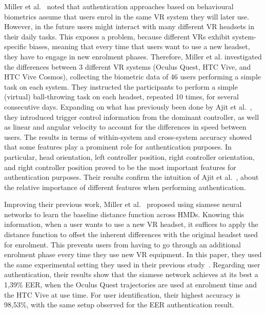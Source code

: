 \documentclass[journal]{IEEEtran}
\begin{document}
Miller et al.~\cite{miller2020} noted that authentication approaches based on behavioural biometrics assume that users enrol in the same VR system they will later use. However, in the future users might interact with many different VR headsets in their daily tasks. This exposes a problem, because different VRs exhibit system-specific biases, meaning that every time that users want to use a new headset, they have to engage in new enrolment phases. Therefore, Miller et al. investigated the differences between 3 different VR systems (Oculus Quest, HTC Vive, and HTC Vive Cosmos), collecting the biometric data of 46 users performing a simple task on each system. They instructed the participants to perform a simple (virtual) ball-throwing task on each headset, repeated 10 times, for several consecutive days. Expanding on what has previously been done by Ajit et al.~\cite{ajit2019}, they introduced trigger control information from the dominant controller, as well as linear and angular velocity to account for the differences in speed between users. The results in terms of within-system and cross-system accuracy showed that some features play a prominent role for authentication purposes. In particular, head orientation, left controller position, right controller orientation, and right controller position proved to be the most important features for authentication purposes. Their results confirm the intuition of Ajit et al.~\cite{ajit2019}, about the relative importance of different features when performing authentication.

Improving their previous work, Miller et al.~\cite{miller2021} proposed using siamese neural networks to learn the baseline distance function across HMDs. Knowing this information, when a user wants to use a new VR headset, it suffices to apply the distance function to offset the inherent differences with the original headset used for enrolment. This prevents users from having to go through an additional enrolment phase every time they use new VR equipment. In this paper, they used the same experimental setting they used in their previous study~\cite{miller2020}. Regarding user authentication, their results show that the siamese network achieves at its best a 1,39\% EER, when the Oculus Quest trajectories are used at enrolment time and the HTC Vive at use time. For user identification, their highest accuracy is 98,53\%, with the same setup observed for the EER authentication result.
\end{document}
